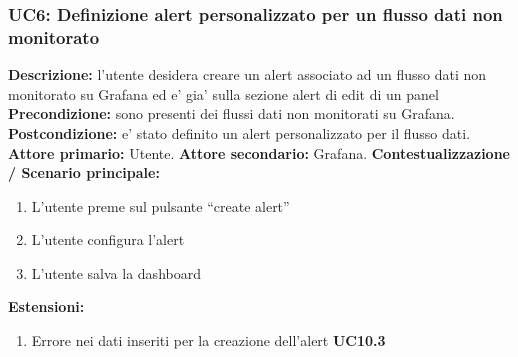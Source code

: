                 \subsubsection{UC6: Definizione alert personalizzato per un flusso dati non monitorato}
                    \textbf{Descrizione:} l’utente desidera creare un alert associato ad un flusso dati non monitorato su Grafana ed e’ gia’ sulla sezione alert di edit di un panel
                    \newline
                    \textbf{Precondizione:} sono presenti dei flussi dati non monitorati su Grafana.
                    \newline
                    \textbf{Postcondizione:} e’ stato definito un alert personalizzato per il flusso dati.
                    \newline
                    \textbf{Attore primario:} Utente.
                    \newline
                    \textbf{Attore secondario:} Grafana.
                    \newline
                    \textbf{Contestualizzazione / Scenario principale:} \begin{enumerate}
                            \item L’utente preme sul pulsante “create alert”
                            \item L’utente configura l’alert 
                            \item L’utente salva la dashboard
                        \end{enumerate}
                    
                    \textbf{Estensioni:} 
                    \begin{enumerate}
                            \item Errore nei dati inseriti per la creazione dell'alert \textbf{UC10.3}
                        \end{enumerate}
                

